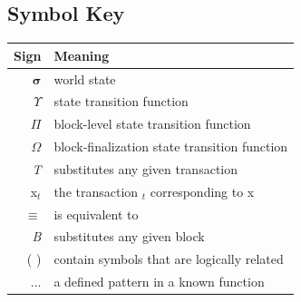 \documentclass[11pt,a4paper,leqno,bibliography=totoc]{scrartcl}
\newenvironment{alphafootnotes}
    {\par\edef\savedfootnotenumber{\number\value{footnote}}
    \renewcommand{\thefootnote}{\alph{footnote}}
     \setcounter{footnote}{0}}
    {\par\setcounter{footnote}{\savedfootnotenumber}}
\begin{document}
\begin{alphafootnotes}
\begin{multicols}{2}


 \clearpage


\subsection{Symbol Key}
 \begin{tabular}{ r l }
 \toprule
 \textbf{Sign} & \textbf{Meaning} \\
 \midrule
 $\boldsymbol{\sigma}$ &  world state \\
 $\Upsilon$ &  state transition function \\
 $\Pi$ &  block-level state transition function \\
 $\Omega$ &  block-finalization state transition function \\
 \textit{T} &  substitutes any given transaction \\
 x$_t$ &  the transaction $_t$ corresponding to x \\
 $\equiv$ & is equivalent to \\
 \textit{B} &  substitutes any given block \\
 (   ) & contain symbols that are logically related \\
   ... & a defined pattern in a known function \\
 \bottomrule
 \end{tabular}


\clearpage


\printbibliography
\clearpage
\printglossary[type=\acronymtype]
\glsaddall
\printnoidxglossaries
\clearpage
\end{multicols}
\end{alphafootnotes}

\printindex


  
\end{document}
